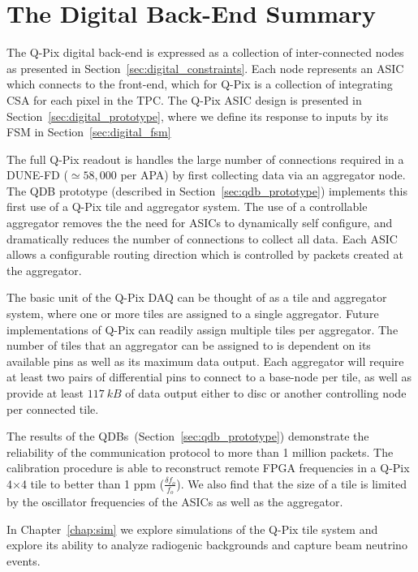 \section{The Digital Back-End Summary}
The Q-Pix digital back-end is expressed as a collection of inter-connected nodes as presented in Section~\ref{sec:digital_constraints}.
Each node represents an ASIC which connects to the front-end, which for Q-Pix is a collection of integrating CSA for each pixel in the TPC.
The Q-Pix ASIC design is presented in Section~\ref{sec:digital_prototype}, where we define its response to inputs by its FSM in Section~\ref{sec:digital_fsm}

The full Q-Pix readout is handles the large number of connections required in a DUNE-FD ($\simeq 58,000$ per APA) by first collecting data via an aggregator node.
The QDB prototype (described in Section~\ref{sec:qdb_prototype}) implements this first use of a Q-Pix tile and aggregator system.
The use of a controllable aggregator removes the the need for ASICs to dynamically self configure, and dramatically reduces the number of connections to collect all data.
Each ASIC allows a configurable routing direction which is controlled by packets created at the aggregator.

The basic unit of the Q-Pix DAQ can be thought of as a tile and aggregator system, where one or more tiles are assigned to a single aggregator.
Future implementations of Q-Pix can readily assign multiple tiles per aggregator.
The number of tiles that an aggregator can be assigned to is dependent on its available pins as well as its maximum data output.
Each aggregator will require at least two pairs of differential pins to connect to a base-node per tile, as well as provide at least $117~\unit{kB}$ of data output either to disc or another controlling node per connected tile.

The results of the QDBs~(Section~\ref{sec:qdb_prototype}) demonstrate the reliability of the communication protocol to more than 1 million packets.
The calibration procedure is able to reconstruct remote FPGA frequencies in a Q-Pix 4$\times$4 tile to better than 1 ppm ($\frac{\delta f_{o}}{f_{o}}$).
We also find that the size of a tile is limited by the oscillator frequencies of the ASICs as well as the aggregator.

In Chapter~\ref{chap:sim} we explore simulations of the Q-Pix tile system and explore its ability to analyze radiogenic backgrounds and capture beam neutrino events.
